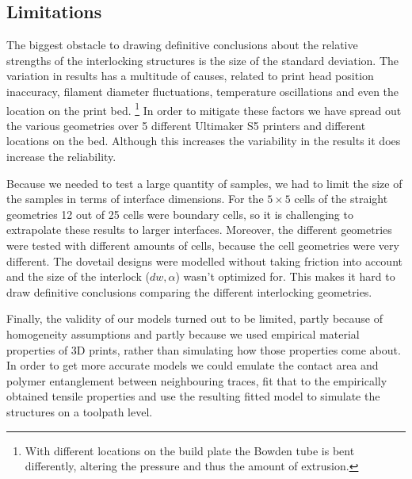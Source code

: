 \subsection{Limitations}
The biggest obstacle to drawing definitive conclusions about the relative strengths of the interlocking structures is the size of the standard deviation.
The variation in results has a multitude of causes, related to print head position inaccuracy, filament diameter fluctuations, temperature oscillations and even the location on the print bed.
\footnote{With different locations on the build plate the Bowden tube is bent differently, altering the pressure and thus the amount of extrusion.}
In order to mitigate these factors we have spread out the various geometries over 5 different Ultimaker S5 printers and different locations on the bed.
Although this increases the variability in the results it does increase the reliability.

Because we needed to test a large quantity of samples, we had to limit the size of the samples in terms of interface dimensions.
For the $5\times5$ cells of the straight geometries 12 out of 25 cells were boundary cells, so it is challenging to extrapolate these results to larger interfaces.
Moreover, the different geometries were tested with different amounts of cells, because the cell geometries were very different.
The dovetail designs were modelled without taking friction into account and the size of the interlock ($dw, \alpha$) wasn't optimized for.
This makes it hard to draw definitive conclusions comparing the different interlocking geometries.

Finally, the validity of our models turned out to be limited,
partly because of homogeneity assumptions and partly because we used empirical material properties of 3D prints, rather than simulating how those properties come about.
In order to get more accurate models we could emulate the contact area and polymer entanglement between neighbouring traces,
fit that to the empirically obtained tensile properties and use the resulting fitted model to simulate the structures on a toolpath level.
